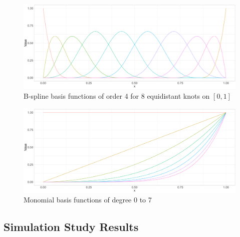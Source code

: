 \documentclass[11pt,twoside,a4paper]{article}
\begin{document}
	\begin{figure}[H]\label{bspline_basis}
		\includegraphics[width = \textwidth]{../Graphics/Bspline_Basis.pdf}
		\caption{B-spline basis functions of order 4 for 8 equidistant knots on $[0,1]$}
	\end{figure}

	\begin{figure}[H]\label{monomial_basis}
		\includegraphics[width = \textwidth]{../Graphics/Monomial_Basis.pdf}
		\caption{Monomial basis functions of degree 0 to 7}
	\end{figure}

\newpage
	\subsection{Simulation Study Results}
	
\end{document}
